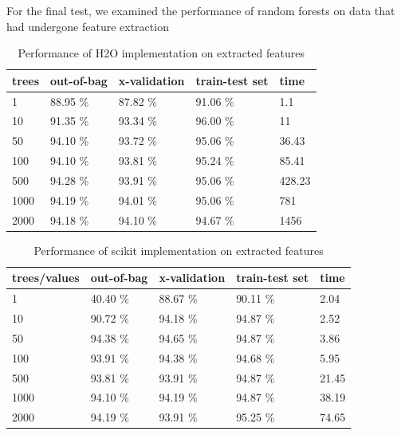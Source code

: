 \documentclass[thesis=B,english]{FITthesis}[2012/10/20]
\begin{document}
For the final test, we examined the performance of random forests on data that had undergone feature extraction \cite{bromovabeclass}

\begin{table}[h]
\begin{tabular}{|l|l|l|l|l|}
\hline
trees        & out-of-bag & x-validation & train-test set & time \\ \hline
1            &88.95 \%            &87.82 \%              &91.06 \%                 & 1.1        \\ \hline
10           &91.35 \%            &93.34 \%              &96.00 \%                 & 11       \\ \hline
50           &94.10 \%            &93.72 \%              &95.06 \%                 & 36.43      \\ \hline
100          &94.10 \%            &93.81 \%              &95.24 \%                 & 85.41      \\ \hline
500          &94.28 \%            &93.91 \%              &95.06 \%                 & 428.23     \\ \hline
1000         &94.19 \%            &94.01 \%              &95.06 \%                 & 781        \\ \hline
2000         &94.18 \%            &94.10 \%              &94.67 \%                 & 1456       \\ \hline
\end{tabular}
\caption{Performance of H2O implementation on extracted features}
\label{tab:h2o-extracted}
\end{table}
\begin{table}[h]
\begin{tabular}{|l|l|l|l|l|}
\hline
trees/values & out-of-bag & x-validation & train-test set & time \\ \hline
1            &40.40 \%           &88.67 \%              &90.11 \%                & 2.04          \\ \hline
10           &90.72 \%           &94.18 \%              &94.87 \%                &2.52           \\ \hline
50           &94.38 \%           &94.65 \%              &94.87 \%                &3.86        \\ \hline
100          &93.91 \%           &94.38 \%              &94.68 \%                &5.95        \\ \hline
500          &93.81 \%           &93.91 \%              &94.87 \%                &21.45      \\ \hline
1000         &94.10 \%           &94.19 \%              &94.87 \%                &38.19         \\ \hline
2000         &94.19 \%           &93.91 \%              &95.25 \%                &74.65        \\ \hline
\end{tabular}
\caption{Performance of scikit implementation on extracted features}
\label{tab:scikit-extracted}
\end{table}
\end{document}
